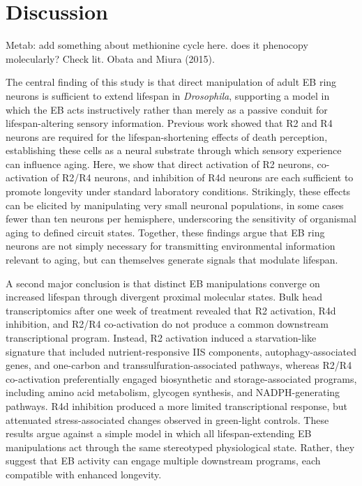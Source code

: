 \section{Discussion}

Metab: add something about methionine cycle here. does it phenocopy molecularly? Check lit. Obata and Miura (2015).

The central finding of this study is that direct manipulation of adult EB ring neurons is sufficient to extend lifespan in \textit{Drosophila}, supporting a model in which the EB acts instructively rather than merely as a passive conduit for lifespan-altering sensory information. Previous work showed that R2 and R4 neurons are required for the lifespan-shortening effects of death perception, establishing these cells as a neural substrate through which sensory experience can influence aging. Here, we show that direct activation of R2 neurons, co-activation of R2/R4 neurons, and inhibition of R4d neurons are each sufficient to promote longevity under standard laboratory conditions. Strikingly, these effects can be elicited by manipulating very small neuronal populations, in some cases fewer than ten neurons per hemisphere, underscoring the sensitivity of organismal aging to defined circuit states. Together, these findings argue that EB ring neurons are not simply necessary for transmitting environmental information relevant to aging, but can themselves generate signals that modulate lifespan.

A second major conclusion is that distinct EB manipulations converge on increased lifespan through divergent proximal molecular states. Bulk head transcriptomics after one week of treatment revealed that R2 activation, R4d inhibition, and R2/R4 co-activation do not produce a common downstream transcriptional program. Instead, R2 activation induced a starvation-like signature that included nutrient-responsive IIS components, autophagy-associated genes, and one-carbon and transsulfuration-associated pathways, whereas R2/R4 co-activation preferentially engaged biosynthetic and storage-associated programs, including amino acid metabolism, glycogen synthesis, and NADPH-generating pathways. R4d inhibition produced a more limited transcriptional response, but attenuated stress-associated changes observed in green-light controls. These results argue against a simple model in which all lifespan-extending EB manipulations act through the same stereotyped physiological state. Rather, they suggest that EB activity can engage multiple downstream programs, each compatible with enhanced longevity.

